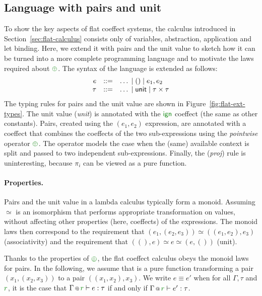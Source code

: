 
\subsection{Language with pairs and unit}
\label{sec:flat-exts-tup}

To show the key aspects of flat coeffect systems, the calculus introduced in Section~\ref{sec:flat-calculus} 
consists only of variables, abstraction, application and let binding. Here, we extend it 
with pairs and the unit value to sketch how it can be turned into a more complete programming 
language and to motivate the laws required about $\cpar$. The syntax of the language is extended as follows:
%
\begin{equation*}
\begin{array}{rcl}
e &::=& \ldots \sep () \sep e_1, e_2 \\
\tau &::=& \ldots \sep \ident{unit} \sep \tau \times \tau
\end{array}
\end{equation*}
%
The typing rules for pairs and the unit value are shown in Figure~\ref{fig:flat-ext-types}.
The unit value (\emph{unit}) is annotated with the $\czero$ coeffect (the same as other constants).
Pairs, created using the $(e_1, e_2)$ expression, are annotated with a coeffect that combines
the coeffects of the two sub-expressions using the \emph{pointwise} operator $\cpar$. The operator
models the case when the (same) available context is split and passed to two independent 
sub-expressions. Finally, the (\emph{proj}) rule is uninteresting, because $\pi_i$ can be 
viewed as a pure function.

\paragraph{Properties.}
Pairs and the unit value in a lambda calculus typically form a monoid. Assuming $\simeq$ is an
isomorphism that performs appropriate transformation on values, without affecting other 
properties (here, coeffects) of the expressions. The monoid laws then correspond to 
the requirement that $(e_1, (e_2, e_3)) \simeq ((e_1, e_2), e_3)$ (associativity) and the
requirement that $((), e) \simeq e \simeq (e, ())$ (unit).

Thanks to the properties of $\cpar$, the flat coeffect calculus obeys the monoid laws for pairs. 
In the following, we assume that  is a pure function transforming a pair $(x_1, (x_2, x_3))$ 
to a pair $((x_1, x_2), x_3)$. We write $e \equiv e'$ when for all $\Gamma, \tau$ and $\cclrd{r}$,
it is the case that $\coctx{\Gamma}{\cclrd{r}} \vdash e : \tau$ if and only if
$\coctx{\Gamma}{\cclrd{r}} \vdash e' : \tau$.

